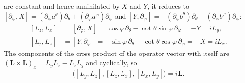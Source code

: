 are constant and hence annihilated by $X$ and $Y$, it reduces to
$[\partial_\varphi,X]=(\partial_\varphi a^\theta)\partial_\theta
+(\partial_\varphi a^\varphi)\partial_\varphi$ and
$[Y,\partial_\varphi]=-(\partial_\varphi b^\theta)\partial_\theta
-(\partial_\varphi b^\varphi)\partial_\varphi$:
\[
\begin{aligned}
{}[L_z,L_x]&=[\partial_\varphi,X]
=\cos\varphi\,\partial_\theta-\cot\theta\sin\varphi\,\partial_\varphi=-Y=iL_y,\\
[L_y,L_z]&=[Y,\partial_\varphi]
=-\sin\varphi\,\partial_\theta-\cot\theta\cos\varphi\,\partial_\varphi=-X=iL_x.
\end{aligned}
\]
The components of the cross product of the operator vector with itself
are $(\mathbf L\times\mathbf L)_x=L_yL_z-L_zL_y$ and cyclically, so
\[
\bigl([L_y,L_z],[L_z,L_x],[L_x,L_y]\bigr)=\boxed{i\mathbf L}.
\]

